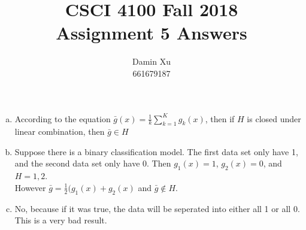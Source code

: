 \documentclass[11pt]{article}
\title{CSCI 4100 Fall 2018 \\
Assignment 5 Answers}
\author{Damin Xu\\661679187}
\begin{document}
\maketitle
\begin{enumerate} [(a)]
	\item According to the equation $\bar{g}(x)=\frac{1}{k}\sum^K_{k=1}g_k(x)$, then if $H$ is closed under linear combination, then $\bar{g}\in H$

	\item Suppose there is a binary classification model. The first data set only have 1, and the second data set only have 0. Then $g_1(x)=1$, $g_2(x)=0$, and $H = {1,2}$.\\However $\bar{g}=\frac{1}{2}(g_1(x)+g_2(x)$ and $\bar{g}\notin H$.

	\item No, because if it was true, the data will be seperated into either all 1 or all 0. This is a very bad result.
\end{enumerate}

\newpage
\end{document}
